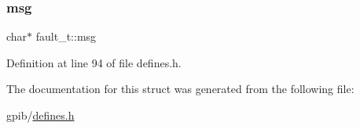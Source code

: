 \subsubsection{\texorpdfstring{msg}{msg}}
{\footnotesize\ttfamily char$\ast$ fault\+\_\+t\+::msg}



Definition at line 94 of file defines.\+h.



The documentation for this struct was generated from the following file\+:\begin{DoxyCompactItemize}
\item 
gpib/\hyperlink{defines_8h}{defines.\+h}\end{DoxyCompactItemize}
